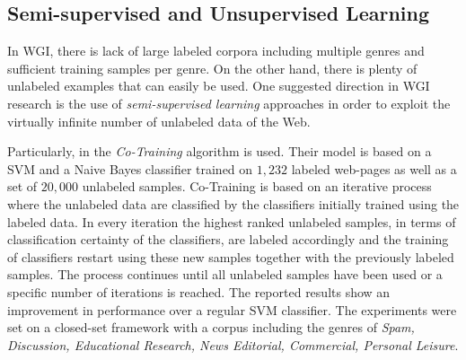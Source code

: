 \begin{itemize}
\begin{end}

\subsection{Semi-supervised and Unsupervised Learning} 

In WGI, there is lack of large labeled corpora including multiple genres and sufficient training samples per genre. On the other hand, there is plenty of unlabeled examples that can easily be used. One suggested direction in WGI research is the use of \textit{semi-supervised learning} approaches in order to exploit the virtually infinite number of unlabeled data of the Web. 

Particularly, in \parencite{chetry2011web} the \textit{Co-Training} algorithm is used. Their model is based on a SVM and a Naive Bayes classifier trained on $1,232$ labeled web-pages as well as a set of $20,000$ unlabeled samples. Co-Training is based on an iterative process where the unlabeled data are classified by the classifiers initially trained using the labeled data. In every iteration the highest ranked unlabeled samples, in terms of classification certainty of the classifiers, are labeled accordingly and the training of classifiers restart using these new samples together with the previously labeled samples. The process continues until all unlabeled samples have been used or a specific number of iterations is reached. The reported results show an improvement in performance over a regular SVM classifier. The experiments were set on a closed-set framework with a corpus including the genres of \textit{Spam, Discussion, Educational Research, News Editorial, Commercial, Personal Leisure}.


\end{end}
\end{itemize}
